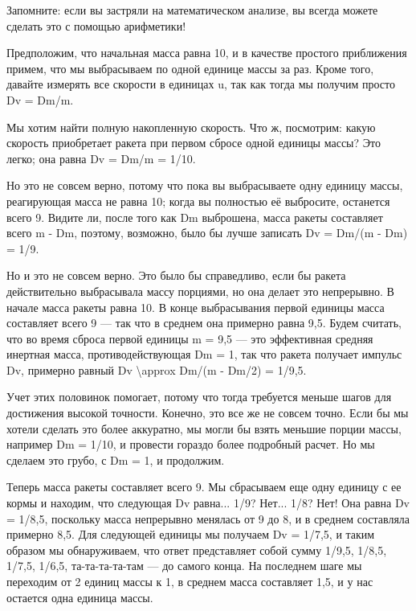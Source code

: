 \documentclass[10pt,oneside]{article}
\newcommand{\TipsRunning}[1]{\par\vspace{2bp}{\centering\footnotesize #1\par}\vspace{2bp}}
\newcommand{\TipsSubsection}[1]{\par\vspace{6bp}{\normalsize\bfseries #1\par}\vspace{2bp}}
\begin{document}
Запомните: если вы застряли на математическом анализе, вы всегда можете сделать это с помощью арифметики!\par

\TipsSubsection{3-4 Численное интегрирование}

Предположим, что начальная масса равна 10, и в качестве простого приближения примем, что мы выбрасываем по одной единице массы за раз. Кроме того, давайте измерять все скорости в единицах u, так как тогда мы получим просто Dv = Dm/m.\par

Мы хотим найти полную накопленную скорость. Что ж, посмотрим: какую скорость приобретает ракета при первом сбросе одной единицы массы? Это легко; она равна Dv = Dm/m = 1/10.\par

Но это не совсем верно, потому что пока вы выбрасываете одну единицу массы, реагирующая масса не равна 10; когда вы полностью её выбросите, останется всего 9. Видите ли, после того как Dm выброшена, масса ракеты составляет всего m - Dm, поэтому, возможно, было бы лучше записать Dv = Dm/(m - Dm) = 1/9.\par

Но и это не совсем верно. Это было бы справедливо, если бы ракета действительно выбрасывала массу порциями, но она делает это непрерывно. В начале масса ракеты равна 10. В конце выбрасывания первой единицы масса составляет всего 9 --- так что в среднем она примерно равна 9,5. Будем считать, что во время сброса первой единицы m = 9,5 --- это эффективная средняя инертная масса, противодействующая Dm = 1, так что ракета получает импульс Dv, примерно равный Dv \textbackslash{}approx Dm/(m - Dm/2) = 1/9,5.\par

Учет этих половинок помогает, потому что тогда требуется меньше шагов для достижения высокой точности. Конечно, это все же не совсем точно. Если бы мы хотели сделать это более аккуратно, мы могли бы взять меньшие порции массы, например Dm = 1/10, и провести гораздо более подробный расчет. Но мы сделаем это грубо, с Dm = 1, и продолжим.\par

\TipsRunning{З А Д А Ч И  И  Р Е Ш Е Н И Я \textbackslash{}textbullet\{\} 1 0 3}

Теперь масса ракеты составляет всего 9. Мы сбрасываем еще одну единицу с ее кормы и находим, что следующая Dv равна... 1/9? Нет... 1/8? Нет! Она равна Dv = 1/8,5, поскольку масса непрерывно менялась от 9 до 8, и в среднем составляла примерно 8,5. Для следующей единицы мы получаем Dv = 1/7,5, и таким образом мы обнаруживаем, что ответ представляет собой сумму 1/9,5, 1/8,5, 1/7,5, 1/6,5, та-та-та-та-там --- до самого конца. На последнем шаге мы переходим от 2 единиц массы к 1, в среднем масса составляет 1,5, и у нас остается одна единица массы.\par
\end{document}
